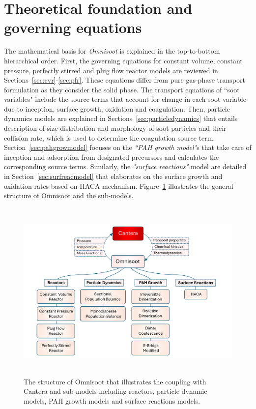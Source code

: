\section{Theoretical foundation and governing equations}
The mathematical basis for \textit{Omnisoot} is explained in the top-to-bottom hierarchical order. First, the governing equations for constant volume, constant pressure, perfectly stirred and plug flow reactor models are reviewed in Sections~\ref{sec:cvr}-\ref{sec:pfr}. These equations differ from pure gas-phase transport formulation as they consider the solid phase. The transport equations of ``soot variables" include the source terms that account for change in each soot variable due to inception, surface growth, oxidation and coagulation. Then, particle dynamics models are explained in Sections~\ref{sec:particledynamics} that entails description of size distribution and morphology of soot particles and their collision rate, which is used to determine the coagulation source term. Section~\ref{sec:pahgrowmodel} focuses on the \textit{``PAH growth model"}s that take care of inception and adsorption from designated precursors and calculates the corresponding source terms. Similarly, the \textit{"surface reactions"} model are detailed in Section~\ref{sec:surfreacmodel} that elaborates on the surface growth and oxidation rates based on HACA mechanism. Figure~\ref{fig:structure} illustrates the general structure of Omnisoot and the sub-models.

\begin{figure}[!htbp]
	\centering
	\includegraphics[height=90mm, ]{Figures/Theory/structure.pdf}
	\caption{The structure of Omnisoot that illustrates the coupling with Cantera and sub-models including reactors, particle dynamic models, PAH growth models and surface reactions models.}
	\label{fig:structure}
\end{figure}

